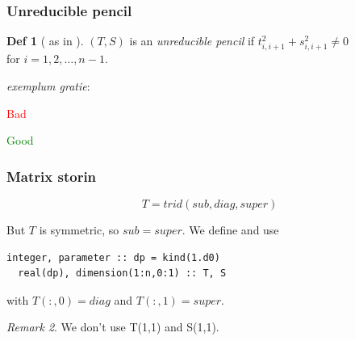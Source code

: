 \documentclass{beamer}
\theoremstyle{definition} \newtheorem{de}{Def}
\theoremstyle{remark} \newtheorem{os}[de]{Remark}
\theoremstyle{plain} \newtheorem{te}[de]{Teo}
\theoremstyle{plain} \newtheorem{co}[de]{Cor}
\theoremstyle{plain} \newtheorem{pr}[de]{Prop}
\theoremstyle{plain} \newtheorem{lem}[de]{Lemm}
\theoremstyle{remark} \newtheorem{rem}[de]{Remark}
\begin{document}
\begin{frame}
\frametitle{Unreducible pencil}

\begin{de}[ as in \cite{principal} ]
  $(T,S)$ is an \emph{unreducible pencil} if $t_{i,i+1}^2 + 
s_{i,i+1}^2 \neq 0$\\
  for $i=1,2,\dots,n-1$.
\end{de}

\pause

\emph{exemplum gratie}:

\begin{Bdescription}
  \item [\textcolor{red}{Bad}]
  
  \item [\textcolor{green}{Good}]
\end{Bdescription}

\end{frame}

\begin{frame}[fragile]
\frametitle{Matrix storin}

\begin{equation*}
  T = trid(sub,diag,super)
\end{equation*}

But $T$ is symmetric, so $sub=super$. We define and use

\begin{lstlisting}[style=fortranSlide, caption={$T,S$ as couple of array}]
  integer, parameter :: dp = kind(1.d0)
  real(dp), dimension(1:n,0:1) :: T, S  
\end{lstlisting}

with $T(:,0)=diag$ and $T(:,1)=super$.

\begin{os}
  We don't use T(1,1) and S(1,1). 
\end{os}

\end{frame}
\end{document}

